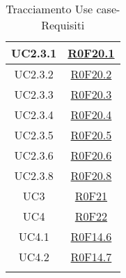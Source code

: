 \documentclass[../AnalisiDeiRequisiti.tex]{subfiles}
\begin{document}
\begin{longtable}{|c|c|}
	UC2.3.1 & \hyperlink{R0F20.1}{R0F20.1}\\\hline
	UC2.3.2 & \hyperlink{R0F20.2}{R0F20.2}\\\hline
	UC2.3.3 & \hyperlink{R0F20.3}{R0F20.3}\\\hline
	UC2.3.4 & \hyperlink{R0F20.4}{R0F20.4}\\\hline
	UC2.3.5 & \hyperlink{R0F20.5}{R0F20.5}\\\hline
	UC2.3.6 & \hyperlink{R0F20.6}{R0F20.6}\\\hline
	UC2.3.8 & \hyperlink{R0F20.8}{R0F20.8}\\\hline
	UC3 & \hyperlink{R0F21}{R0F21}\\\hline
	UC4 & \hyperlink{R0F22}{R0F22}\\\hline
	UC4.1 & \hyperlink{R0F14.6}{R0F14.6}\\\hline
	UC4.2 & \hyperlink{R0F14.7}{R0F14.7}\\\hline
	\caption[Tracciamento Use case-Requisiti]{Tracciamento Use case-Requisiti}
	\label{tabella:usecase-requi}
\end{longtable}
\clearpage
\end{document}
